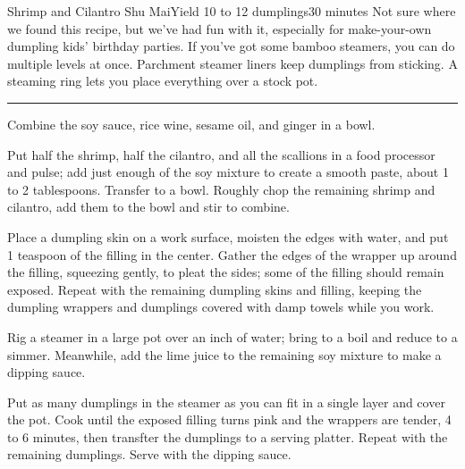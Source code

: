 \begin{recipe}{Shrimp and Cilantro Shu Mai}{Yield 10 to 12 dumplings}{30 minutes}
\freeform Not sure where we found this recipe, but we've had fun with it, especially for make-your-own dumpling kids' birthday parties. If you've got some bamboo steamers, you can do multiple levels at once. Parchment steamer liners keep dumplings from sticking. A steaming ring lets you place everything over a stock pot.\\
\rule{\textwidth}{0.05pt}

Combine the soy sauce, rice wine, sesame oil, and ginger in a bowl.

Put half the shrimp, half the cilantro, and all the scallions in a food processor and pulse; add just enough of the soy mixture to create a smooth paste, about 1 to 2 tablespoons. Transfer to a bowl. Roughly chop the remaining shrimp and cilantro, add them to the bowl and stir to combine.

Place a dumpling skin on a work surface, moisten the edges with water, and put 1 teaspoon of the filling in the center. Gather the edges of the wrapper up around the filling, squeezing gently, to pleat the sides; some of the filling should remain exposed. Repeat with the remaining dumpling skins and filling, keeping the dumpling wrappers and dumplings covered with damp towels while you work.

Rig a steamer in a large pot over an inch of water; bring to a boil and reduce to a simmer. Meanwhile, add the lime juice to the remaining soy mixture to make a dipping sauce.

\newstep 
Put as many dumplings in the steamer as you can fit in a single layer and cover the pot. Cook until the exposed filling turns pink and the wrappers are tender, 4 to 6 minutes, then transfter the dumplings to a serving platter. Repeat with the remaining dumplings. Serve with the dipping sauce.

\end{recipe}